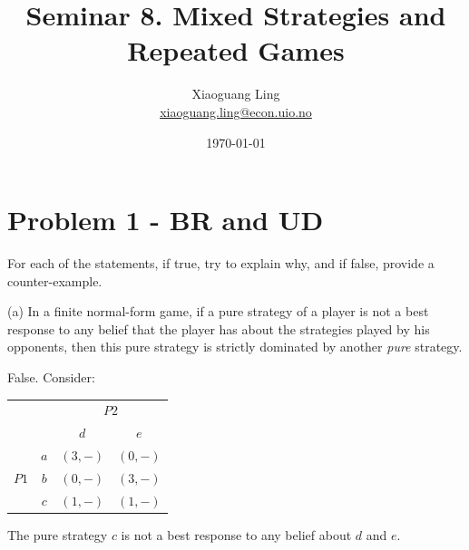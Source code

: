 \documentclass{article}
\title{Seminar 8. Mixed Strategies and Repeated Games}
\author{Xiaoguang Ling \\  \href{xiaoguang.ling@econ.uio.no}{xiaoguang.ling@econ.uio.no}}
\date{\today}
\begin{document}
\maketitle


\section{Problem 1 - BR and UD} 

For each of the statements, if true, try to explain why, and if false, provide a
counter-example.

\bigskip

(a) In a finite normal-form game, if a pure strategy of a
player is not a best response to any belief that the player has about the strategies played by his opponents, then this pure strategy is strictly dominated by another \textit{pure} strategy.\\

\medskip

False. Consider:

\begin{center}
\label{tab:brud}
\begin{tabular}{cc|c|c|}
  & \multicolumn{1}{c}{} & \multicolumn{2}{c}{$P2$}  \\
  & \multicolumn{1}{c}{} & \multicolumn{1}{c}{$d$} & \multicolumn{1}{c}{$e$} \\\cline{3-4}
            & $a$ & $(3,-)$ & $(0,-)$ \\   \cline{3-4}  
   $P1$ & $b$ & $(0,-)$ & $(3,-)$ \\   \cline{3-4}
            & $c$ & $(1,-)$ & $(1,-)$ \\   \cline{3-4}

\end{tabular}
\end{center}

The pure strategy $c$ is not a best response to any belief about $d$ and $e$.

\smallskip
\end{document}
